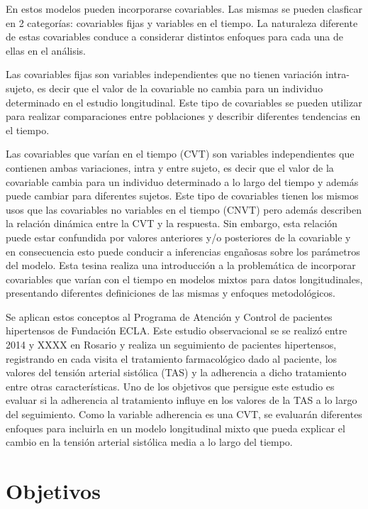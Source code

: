 \documentclass[spanish]{article}
\numberwithin{figure}{subsection}
\numberwithin{equation}{subsection}
\numberwithin{table}{subsection}
\begin{document}
En estos modelos pueden incorporarse covariables. Las mismas se pueden clasficar
en 2 categorías: covariables fijas y variables en el tiempo. La naturaleza
diferente de estas covariables conduce a considerar distintos enfoques para cada
una de ellas en el análisis.

Las covariables fijas son variables independientes que no tienen variación
intra-sujeto, es decir que el valor de la covariable no cambia para un individuo
determinado en el estudio longitudinal. Este tipo de covariables se pueden
utilizar para realizar comparaciones entre poblaciones y describir diferentes
tendencias en el tiempo.

Las covariables que varían en el tiempo (CVT) son variables independientes que
contienen ambas variaciones, intra y entre sujeto, es decir que el valor de la
covariable cambia para un individuo determinado a lo largo del tiempo y además
puede cambiar para diferentes sujetos. Este tipo de covariables tienen los
mismos usos que las covariables no variables en el tiempo (CNVT) pero además
describen la relación dinámica entre la CVT y la respuesta. Sin embargo, esta
relación puede estar confundida por valores anteriores y/o posteriores de la
covariable y en consecuencia esto puede conducir a inferencias engañosas sobre
los parámetros del modelo. Esta tesina realiza una introducción a la
problemática de incorporar covariables que varían con el tiempo en modelos
mixtos para datos longitudinales, presentando diferentes definiciones de las
mismas y enfoques metodológicos.

Se aplican estos conceptos al Programa de Atención y Control de pacientes
hipertensos de Fundación ECLA. Este estudio observacional se se realizó entre
2014 y XXXX en Rosario y realiza un seguimiento de pacientes hipertensos,
registrando en cada visita el tratamiento farmacológico dado al paciente, los
valores del tensión arterial sistólica (TAS) y la adherencia a dicho tratamiento
entre otras características. Uno de los objetivos que persigue este estudio es
evaluar si la adherencia al tratamiento influye en los valores de la TAS a lo
largo del seguimiento. Como la variable adherencia es una CVT, se evaluarán
diferentes enfoques para incluirla en un modelo longitudinal mixto que pueda
explicar el cambio en la tensión arterial sistólica media a lo largo del tiempo.

\newpage
\section{Objetivos}
\end{document}
